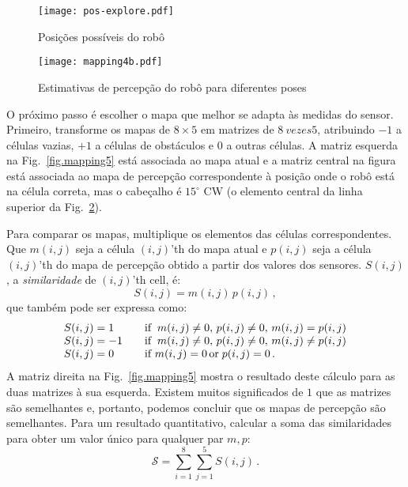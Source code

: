 \begin{figure}
\begin{center}
\texttt{[image: pos-explore.pdf]}
\end{center}
\caption{Posições possíveis do robô}\label{fig.pos-explore}
\end{figure}

\begin{figure}
\begin{center}
\texttt{[image: mapping4b.pdf]}
\end{center}
\caption{Estimativas de percepção do robô para diferentes poses}\label{fig.mapping4}
\end{figure}

O próximo passo é escolher o mapa que melhor se adapta às medidas do sensor. Primeiro, transforme os mapas de $8\times 5$ em matrizes de $8\ vezes 5$, atribuindo $-1$ a células vazias, $+1$ a células de obstáculos e $0$ a outras células. A matriz esquerda na Fig.~\ref{fig.mapping5} está associada ao mapa atual e a matriz central na figura está associada ao mapa de percepção correspondente à posição onde o robô está na célula correta, mas o cabeçalho é $15^\circ$ CW (o elemento central da linha superior da Fig.~\ref{fig.mapping4}).

Para comparar os mapas, multiplique os elementos das células correspondentes. Que $m(i,j)$ seja a célula $(i,j)$'th do mapa atual e $p(i,j)$ seja a célula $(i,j)$'th do mapa de percepção obtido a partir dos valores dos sensores. $S(i,j)$, a \emph{similaridade} de $(i,j)$'th cell, é:
\[
S(i,j) = m(i,j)\, p(i,j)\,,
\]
que também pode ser expressa como:
\[
\begin{array}{l@{\hspace{2em}}l}
S(i,j) = 1 & \textrm{if}\;\;m(i,j) \neq 0,\, p(i,j) \neq 0,\, m(i,j) = p(i,j)\\
S(i,j) = -1 & \textrm{if}\;\;m(i,j) \neq 0,\, p(i,j) \neq 0,\,  m(i,j) \neq p(i,j)\\
S(i,j) = 0 & \textrm{if }m(i,j) = 0\, \textrm{or}\; p(i,j) = 0\,.
\end{array}
\]
A matriz direita na Fig.~\ref{fig.mapping5} mostra o resultado deste cálculo para as duas matrizes à sua esquerda. Existem muitos significados de $1$ que as matrizes são semelhantes e, portanto, podemos concluir que os mapas de percepção são semelhantes. Para um resultado quantitativo, calcular a soma das similaridades para obter um valor único para qualquer par $m,p$:
\[
\mathcal{S} = \sum_{i=1}^8 \sum_{j=1}^5 S(i,j)\,.
\]

